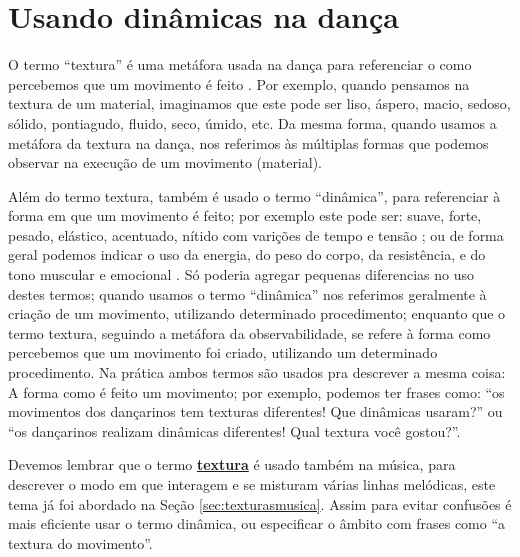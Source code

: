 \section{Usando dinâmicas na dança }
\label{sec:musicalidade:dinamicas}

O termo ``textura'' é uma metáfora usada na dança para referenciar 
o como percebemos que um movimento é feito \cite[pp. 127,268,270]{preston1995dance}.
Por exemplo, quando pensamos na textura de um material,
imaginamos que este pode ser liso, áspero, macio, sedoso, sólido, pontiagudo, fluido, seco, úmido, etc. 
Da mesma forma, quando usamos a metáfora  da textura na dança,
nos referimos às múltiplas formas que podemos observar na execução de um movimento (material).

Além do termo textura, também é usado o termo ``dinâmica'', para referenciar à forma em que um movimento é feito;
por exemplo este pode ser: suave, forte, pesado, elástico, acentuado, nítido com varições de tempo e tensão \cite[pp. 268]{preston1995dance}
\cite[pp. 10]{cullingford2013children} \cite[pp. 424, 447]{guest2013labanotation};
ou de forma geral podemos indicar o uso da energia, do peso do corpo, da resistência, e do tono muscular e emocional \cite[pp. 424]{cullingford2013children}.
Só poderia agregar pequenas diferencias no uso destes termos;
quando usamos o termo ``dinâmica'' nos referimos geralmente à criação de um movimento, 
utilizando determinado procedimento;
enquanto que o termo textura, seguindo a metáfora da observabilidade, 
se refere à forma como percebemos que um movimento foi criado, utilizando  um determinado procedimento.
Na prática ambos termos são usados pra descrever a mesma coisa: A forma como é feito um movimento;
por exemplo, podemos ter frases como: ``os movimentos dos dançarinos tem texturas diferentes! Que dinâmicas usaram?''
ou ``os dançarinos realizam dinâmicas diferentes! Qual textura você gostou?''.

\begin{tcbattention}
Devemos lembrar que o termo \hyperref[sec:texturasmusica]{\textbf{textura}} 
é usado também na música, 
para descrever o modo em que interagem e se misturam várias linhas melódicas,
este tema já foi abordado na Seção \ref{sec:texturasmusica}.
Assim para evitar confusões é mais eficiente usar o termo dinâmica,
ou especificar o âmbito com frases como ``a textura do movimento''.
\end{tcbattention}


